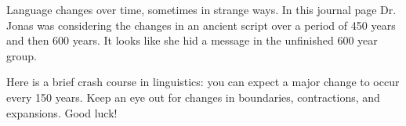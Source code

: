 Language changes over time, sometimes in strange ways.
In this journal page Dr. Jonas was considering the changes in an ancient script over a period of 450 years and then 600 years.
It looks like she hid a message in the unfinished 600 year group.

Here is a brief crash course in linguistics: you can expect a major change to occur every 150 years.
Keep an eye out for changes in boundaries, contractions, and expansions.
Good luck!
